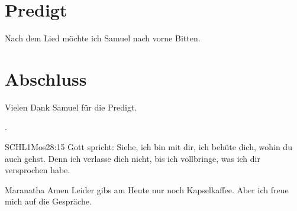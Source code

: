 \documentclass{../../inc/mybib}
\begin{document}
\section{Predigt}
Nach dem Lied möchte ich Samuel nach vorne Bitten.





\section{Abschluss}
Vielen Dank Samuel für die Predigt.

.

\beten{}

\begin{bibelbox}{SCHL}{1Mos}{28:15}
    Gott spricht: Siehe, ich bin mit dir,
    ich behüte dich, wohin du auch gehst.
    Denn ich verlasse dich nicht,
    bis ich vollbringe, was ich dir versprochen habe.
\end{bibelbox}

Maranatha Amen
Leider gibs am Heute nur noch Kapselkaffee. Aber ich freue mich auf die Gespräche.
\end{document}

